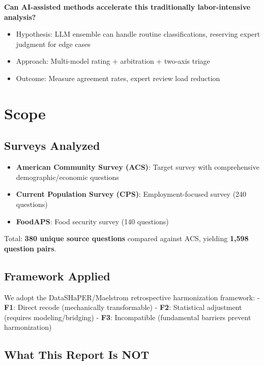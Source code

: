 \documentclass[
  letterpaper,
]{report}
\providecommand{\tightlist}{%
  \setlength{\itemsep}{0pt}\setlength{\parskip}{0pt}}
\begin{document}
\textbf{Can AI-assisted methods accelerate this traditionally
labor-intensive analysis?}

\begin{itemize}
\tightlist
\item
  Hypothesis: LLM ensemble can handle routine classifications, reserving
  expert judgment for edge cases
\item
  Approach: Multi-model rating + arbitration + two-axis triage
\item
  Outcome: Measure agreement rates, expert review load reduction
\end{itemize}

\section{Scope}\label{scope}

\subsection{Surveys Analyzed}\label{surveys-analyzed}

\begin{itemize}
\tightlist
\item
  \textbf{American Community Survey (ACS)}: Target survey with
  comprehensive demographic/economic questions
\item
  \textbf{Current Population Survey (CPS)}: Employment-focused survey
  (240 questions)
\item
  \textbf{FoodAPS}: Food security survey (140 questions)
\end{itemize}

Total: \textbf{380 unique source questions} compared against ACS,
yielding \textbf{1,598 question pairs}.

\subsection{Framework Applied}\label{framework-applied}

We adopt the DataSHaPER/Maelstrom retrospective harmonization framework:
- \textbf{F1}: Direct recode (mechanically transformable) - \textbf{F2}:
Statistical adjustment (requires modeling/bridging) - \textbf{F3}:
Incompatible (fundamental barriers prevent harmonization)

\subsection{What This Report Is NOT}\label{what-this-report-is-not}
\end{document}
